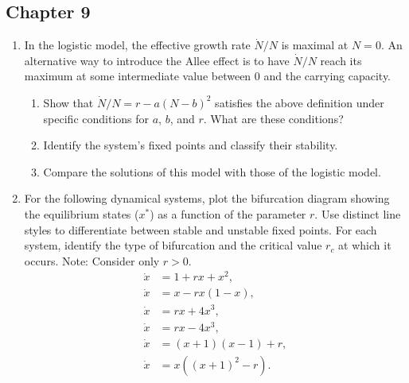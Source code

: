 \subsection*{Chapter 9}
\begin{enumerate}
  \item In the logistic model, the effective growth rate $\dot{N}/N$ is maximal at $N=0$. An alternative way to introduce the Allee effect is to have $\dot{N}/N$ reach its maximum at some intermediate value between 0 and the carrying capacity.

  \begin{enumerate}
    \item Show that $\dot{N}/N = r - a(N-b)^2$ satisfies the above definition under specific conditions for $a$, $b$, and $r$. What are these conditions?
    \item Identify the system's fixed points and classify their stability.
    \item Compare the solutions of this model with those of the logistic model.
  \end{enumerate}
  \item For the following dynamical systems, plot the bifurcation diagram showing the equilibrium states ($x^*$) as a function of the parameter $r$. Use distinct line styles to differentiate between stable and unstable fixed points. For each system, identify the type of bifurcation and the critical value $r_c$ at which it occurs. Note: Consider only $r > 0$.
  \begin{align*}
    \dot{x} &= 1+r x+x^2, \\
    \dot{x} &= x - rx (1-x), \\
    \dot{x} &= r x+4 x^3, \\
    \dot{x} &= r x-4 x^3, \\
    \dot{x} &= (x + 1)(x - 1) + r, \\
    \dot{x} &= x((x+1)^2 - r).
  \end{align*}
\end{enumerate}
